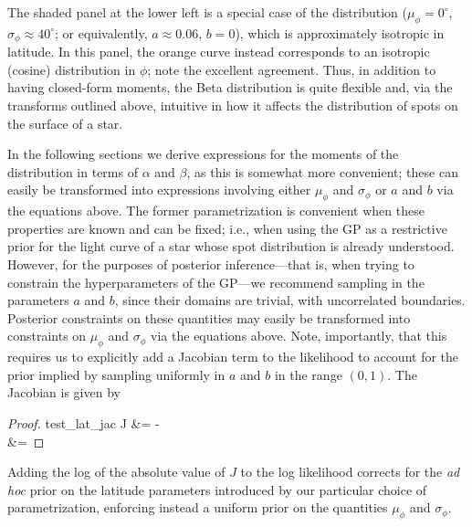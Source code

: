 \documentclass[modern,linenumbers]{aastex62}
\begin{document}
The shaded panel at the lower left is a special case of the distribution
($\mu_\phi = 0^\circ$, $\sigma_\phi \approx 40^\circ$; or equivalently,
$a \approx 0.06$, $b = 0$), which is approximately isotropic in latitude. In
this panel, the orange curve instead corresponds to an isotropic (cosine)
distribution in $\phi$; note the excellent agreement.
%
Thus, in addition to having closed-form moments, the Beta distribution is
quite flexible and, via the transforms outlined above, intuitive in how
it affects the distribution of spots on the surface of a star.

In the following sections we derive expressions
for the moments of the distribution in terms
of $\alpha$ and $\beta$, as this is somewhat more convenient; these
can easily be transformed into expressions involving either $\mu_\phi$ and $\sigma_\phi$
or $a$ and $b$ via the equations above. The former parametrization is convenient
when these properties are known and can be fixed; i.e., when using the GP as
a restrictive prior for the light curve of a star whose spot distribution is
already understood.
However, for the purposes of posterior inference---that is, when trying to
constrain the hyperparameters of the GP---we recommend sampling in the
parameters $a$ and $b$, since their domains are trivial,
with uncorrelated boundaries. Posterior constraints on these quantities may
easily be transformed into constraints on $\mu_\phi$ and $\sigma_\phi$
via the equations above. Note, importantly, that this
requires us to explicitly add a Jacobian term to the likelihood
to account for the prior implied by sampling uniformly in $a$ and $b$
in the range $(0, 1)$.
The Jacobian is given by
%
\begin{linenomath}\begin{proof}{test_lat_jac}
        \label{eq:J}
        J &=
         -
        \\
        &=
        \nonumber
    \end{proof}\end{linenomath}
%
Adding the log of the absolute value of $J$ to the log likelihood
corrects for the \emph{ad hoc}
prior on the latitude parameters introduced by our particular choice of
parametrization, enforcing instead a uniform prior on the quantities $\mu_\phi$
and $\sigma_\phi$.
\end{document}
